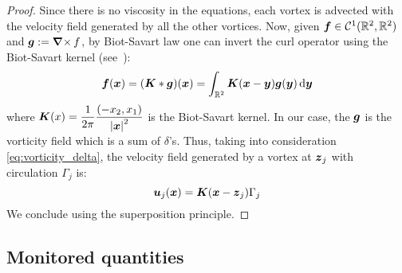 \documentclass[../main.tex]{subfiles}
\begin{document}
\begin{proof}
	Since there is no viscosity in the equations, each vortex is advected with the velocity field generated by all the other vortices. Now, given $\boldsymbol{f}\in \mathcal{C}^1(\mathbb{R}^2,\mathbb{R}^2)$ and $\boldsymbol{g}:=\operatorname{\boldsymbol{\nabla}\times} f$, by Biot-Savart law one can invert the curl operator using the Biot-Savart kernel (see~\cite{Griffiths}):
	\begin{equation}
		\boldsymbol{f}(\boldsymbol{x}) = (\boldsymbol{K} * \boldsymbol{g})(\boldsymbol{x}) = \int_{\mathbb{R}^2} \boldsymbol{K}(\boldsymbol{x}-\boldsymbol{y}) \boldsymbol{g}(\boldsymbol{y}) \dd{\boldsymbol{y}}
	\end{equation}
	where $\displaystyle\boldsymbol{K}(x) = \frac{1}{2\pi} \frac{(-x_2,x_1)}{{\abs{\boldsymbol{x}}^2}}$ is the Biot-Savart kernel. In our case, the $\boldsymbol{g}$ is the vorticity field which is a sum of $\delta$'s. Thus, taking into consideration \cref{eq:vorticity_delta}, the velocity field generated by a vortex at $\boldsymbol{z}_j$ with circulation $\Gamma_j$ is:
	\begin{equation}
		\boldsymbol{u}_j(\boldsymbol{x}) = \boldsymbol{K}(\boldsymbol{x}-\boldsymbol{z}_j) \Gamma_j
	\end{equation}
	We conclude using the superposition principle.
\end{proof}

\subsection{Monitored quantities}
\end{document}
